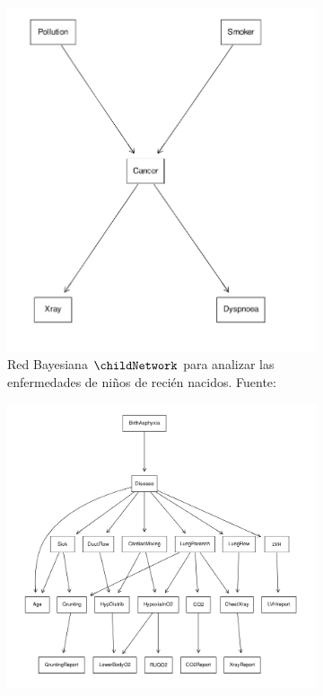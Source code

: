 \begin{figure}[ht]
	\centering
	
	\begin{subfigure}[b]{0.3\textwidth}
		\centering
		\includegraphics[width=\textwidth]{img/bayesianNetworks/cancerNetwork.png}
		\caption{Red Bayesiana $\childNetwork$ para analizar las enfermedades de niños de recién nacidos. Fuente: \cite{cancerNetwork}}
		\label{fig:cancer_network}
	\end{subfigure}
	\hfill
	\begin{subfigure}[b]{0.6\textwidth}
		\centering
		\includegraphics[width=\textwidth]{img/bayesianNetworks/childNetwork.png}

\end{subfigure}
\end{figure}
